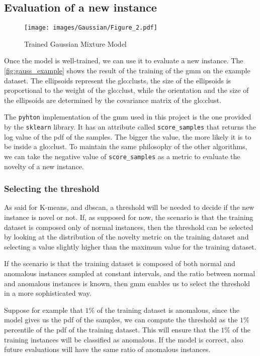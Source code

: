 \subsection{Evaluation of a new instance}
\label{sec:gauss_eval}
\begin{figure}
    \centering
    \texttt{[image: images/Gaussian/Figure\_2.pdf]}
    \caption{Trained Gaussian Mixture Model}
    \label{fig:gauss_example}
\end{figure}
Once the model is well-trained, we can use it to evaluate a new instance. The \autoref{fig:gauss_example} shows the result of the training of the \gls{gmm} on the example dataset. The ellipsoids represent the \gls{glo:clust}s, the size of the ellipsoids is proportional to the weight of the \gls{glo:clust}, while the orientation and the size of the ellipsoids are determined by the covariance matrix of the \gls{glo:clust}. 

The \texttt{pyhton} implementation of the \gls{gmm} used in this project is the one provided by the \texttt{sklearn} library. It has an attribute called \texttt{score\_samples} that returns the log value of the \gls{pdf} of the samples.
The bigger the value, the more likely it is to be inside a \gls{glo:clust}. 
To maintain the same philosophy of the other algorithms, we can take the negative value of \texttt{score\_samples} as a metric to evaluate the novelty of a new instance. 

\subsubsection{Selecting the threshold}
As said for K-means, and \gls{dbscan}, a threshold will be needed to decide if the new instance is novel or not. If, as supposed for now, the scenario is that the training dataset is composed only of normal instances, then the threshold can be selected by looking at the distribution of the novelty metric on the training dataset and selecting a value slightly higher than the maximum value for the training dataset.

If the scenario is that the training dataset is composed of both normal and anomalous instances sampled at constant intervals, and the ratio between normal and anomalous instances is known, then \gls{gmm} enables us to select the threshold in a more sophisticated way.

Suppose for example that $1\%$ of the training dataset is anomalous, since the model gives us the \gls{pdf} of the samples, we can compute the threshold as the $1\%$ percentile of the \gls{pdf} of the training dataset. This will ensure that the $1\%$ of the training instances will be classified as anomalous. If the model is correct, also future evaluations will have the same ratio of anomalous instances.

